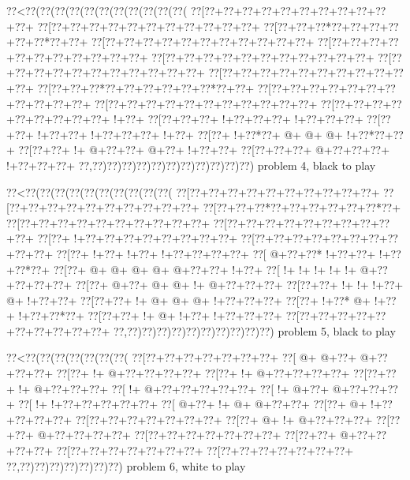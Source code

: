 \vbox{\vbox{\goo
\0??<\0??(\0??(\0??(\0??(\0??(\0??(\0??(\0??(\0??(\0??(\0??(
\0??[\0??+\0??+\0??+\0??+\0??+\0??+\0??+\0??+\0??+\0??+\0??+
\0??[\0??+\0??+\0??+\0??+\0??+\0??+\0??+\0??+\0??+\0??+\0??+
\0??[\0??+\0??+\0??*\0??+\0??+\0??+\0??+\0??+\0??*\0??+\0??+
\0??[\0??+\0??+\0??+\0??+\0??+\0??+\0??+\0??+\0??+\0??+\0??+
\0??[\0??+\0??+\0??+\0??+\0??+\0??+\0??+\0??+\0??+\0??+\0??+
\0??[\0??+\0??+\0??+\0??+\0??+\0??+\0??+\0??+\0??+\0??+\0??+
\0??[\0??+\0??+\0??+\0??+\0??+\0??+\0??+\0??+\0??+\0??+\0??+
\0??[\0??+\0??+\0??+\0??+\0??+\0??+\0??+\0??+\0??+\0??+\0??+
\0??[\0??+\0??+\0??*\0??+\0??+\0??+\0??+\0??+\0??*\0??+\0??+
\0??[\0??+\0??+\0??+\0??+\0??+\0??+\0??+\0??+\0??+\0??+\0??+
\0??[\0??+\0??+\0??+\0??+\0??+\0??+\0??+\0??+\0??+\0??+\0??+
\0??[\0??+\0??+\0??+\0??+\0??+\0??+\0??+\0??+\0??+\- !+\0??+
\0??[\0??+\0??+\0??+\- !+\0??+\0??+\0??+\- !+\0??+\0??+\0??+
\0??[\0??+\0??+\- !+\0??+\0??+\- !+\0??+\0??+\0??+\- !+\0??+
\0??[\0??+\- !+\0??*\0??+\- @+\- @+\- @+\- !+\0??*\0??+\0??+
\0??[\0??+\0??+\- !+\- @+\0??+\0??+\- @+\0??+\- !+\0??+\0??+
\0??[\0??+\0??+\0??+\- @+\0??+\0??+\0??+\- !+\0??+\0??+\0??+
\0??,\0??)\0??)\0??)\0??)\0??)\0??)\0??)\0??)\0??)\0??)\0??)
}
\hfil problem 4, black to play\hfil\break
}

\vbox{\vbox{\goo
\0??<\0??(\0??(\0??(\0??(\0??(\0??(\0??(\0??(\0??(\0??(
\0??[\0??+\0??+\0??+\0??+\0??+\0??+\0??+\0??+\0??+\0??+
\0??[\0??+\0??+\0??+\0??+\0??+\0??+\0??+\0??+\0??+\0??+
\0??[\0??+\0??+\0??*\0??+\0??+\0??+\0??+\0??+\0??*\0??+
\0??[\0??+\0??+\0??+\0??+\0??+\0??+\0??+\0??+\0??+\0??+
\0??[\0??+\0??+\0??+\0??+\0??+\0??+\0??+\0??+\0??+\0??+
\0??[\0??+\- !+\0??+\0??+\0??+\0??+\0??+\0??+\0??+\0??+
\0??[\0??+\0??+\0??+\0??+\0??+\0??+\0??+\0??+\0??+\0??+
\0??[\0??+\- !+\0??+\- !+\0??+\- !+\0??+\0??+\0??+\0??+
\0??[\- @+\0??+\0??*\- !+\0??+\0??+\- !+\0??+\0??*\0??+
\0??[\0??+\- @+\- @+\- @+\- @+\- @+\0??+\0??+\- !+\0??+
\0??[\- !+\- !+\- !+\- !+\- !+\- @+\0??+\0??+\0??+\0??+
\0??[\0??+\- @+\0??+\- @+\- @+\- !+\- @+\0??+\0??+\0??+
\0??[\0??+\0??+\- !+\- !+\- !+\0??+\- @+\- !+\0??+\0??+
\0??[\0??+\0??+\- !+\- @+\- @+\- @+\- !+\0??+\0??+\0??+
\0??[\0??+\- !+\0??*\- @+\- !+\0??+\- !+\0??+\0??*\0??+
\0??[\0??+\0??+\- !+\- @+\- !+\0??+\- !+\0??+\0??+\0??+
\0??[\0??+\0??+\0??+\0??+\0??+\0??+\0??+\0??+\0??+\0??+
\0??,\0??)\0??)\0??)\0??)\0??)\0??)\0??)\0??)\0??)\0??)
}
\hfil problem 5, black to play\hfil\break
}

\vbox{\vbox{\goo
\0??<\0??(\0??(\0??(\0??(\0??(\0??(\0??(
\0??[\0??+\0??+\0??+\0??+\0??+\0??+\0??+
\0??[\- @+\- @+\0??+\- @+\0??+\0??+\0??+
\0??[\0??+\- !+\- @+\0??+\0??+\0??+\0??+
\0??[\0??+\- !+\- @+\0??+\0??+\0??+\0??+
\0??[\0??+\0??+\- !+\- @+\0??+\0??+\0??+
\0??[\- !+\- @+\0??+\0??+\0??+\0??+\0??+
\0??[\- !+\- @+\0??+\- @+\0??+\0??+\0??+
\0??[\- !+\- !+\0??+\0??+\0??+\0??+\0??+
\0??[\- @+\0??+\- !+\- @+\- @+\0??+\0??+
\0??[\0??+\- @+\- !+\0??+\0??+\0??+\0??+
\0??[\0??+\0??+\0??+\0??+\0??+\0??+\0??+
\0??[\0??+\- @+\- !+\- @+\0??+\0??+\0??+
\0??[\0??+\0??+\- @+\0??+\0??+\0??+\0??+
\0??[\0??+\0??+\0??+\0??+\0??+\0??+\0??+
\0??[\0??+\0??+\- @+\0??+\0??+\0??+\0??+
\0??[\0??+\0??+\0??+\0??+\0??+\0??+\0??+
\0??[\0??+\0??+\0??+\0??+\0??+\0??+\0??+
\0??,\0??)\0??)\0??)\0??)\0??)\0??)\0??)
}
\hfil problem 6, white to play\hfil\break
}


